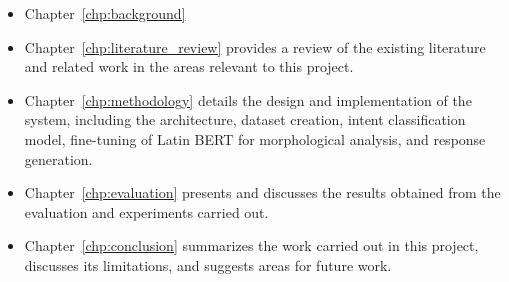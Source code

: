 \begin{itemize}
    \item Chapter~\ref{chp:background}
    \item Chapter~\ref{chp:literature_review} provides a review of the existing literature and related work in the areas relevant to this project.
    \item Chapter~\ref{chp:methodology} details the design and implementation of the system, including the architecture, dataset creation, intent classification model, fine-tuning of Latin BERT for morphological analysis, and response generation.
    \item Chapter~\ref{chp:evaluation} presents and discusses the results obtained from the evaluation and experiments carried out.
    \item Chapter~\ref{chp:conclusion} summarizes the work carried out in this project, discusses its limitations, and suggests areas for future work.
\end{itemize}
